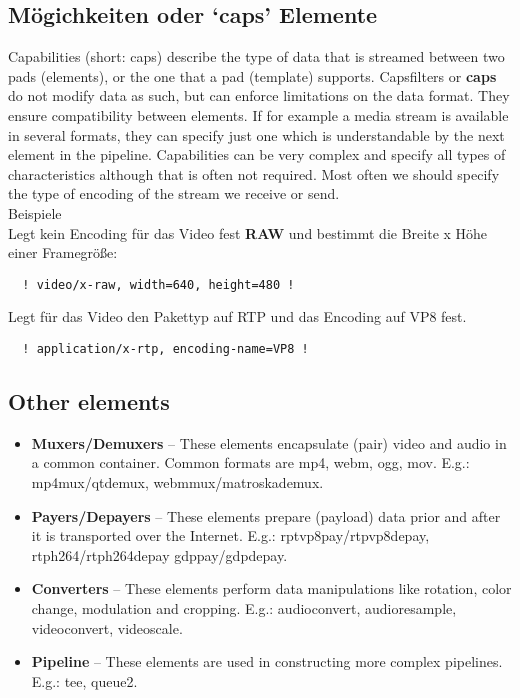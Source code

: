 \subsection{Mögichkeiten oder ‘caps’ Elemente}
Capabilities (short: caps) describe the type of data that is streamed between two pads (elements), or the one that a pad (template) supports. Capsfilters or \textbf{caps} do not modify data as such, but can enforce limitations on the data format. They ensure compatibility between elements. If for example a media stream is available in several formats, they can specify just one which is understandable by the next element in the pipeline. Capabilities can be very complex and specify all types of characteristics although that is often not required. Most often we should specify the type of encoding of the stream we receive or send.\\

Beispiele\\
Legt kein Encoding für das Video fest \textbf{RAW} und bestimmt die Breite x Höhe einer Framegröße:
\begin{verbatim}
  ! video/x-raw, width=640, height=480 !
\end{verbatim}
Legt für das Video den Pakettyp auf RTP und das Encoding auf VP8 fest.
\begin{verbatim}
  ! application/x-rtp, encoding-name=VP8 !
\end{verbatim}

\subsection{Other elements}
\begin{itemize}
\item \textbf{Muxers/Demuxers} – These elements encapsulate (pair) video and audio in a common container. Common formats are mp4, webm, ogg, mov.
E.g.:  mp4mux/qtdemux, webmmux/matroskademux.
\item \textbf{Payers/Depayers} – These elements prepare (payload) data prior and after it is transported over the Internet.
E.g.: rptvp8pay/rtpvp8depay,  rtph264/rtph264depay gdppay/gdpdepay.
\item \textbf{Converters} – These elements perform data manipulations like rotation, color change, modulation and cropping.
E.g.: audioconvert, audioresample, videoconvert, videoscale.
\item \textbf{Pipeline} – These elements are used in constructing more complex pipelines. E.g.: tee, queue2.
\end{itemize}

